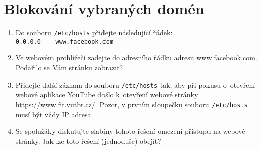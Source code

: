\section{Blokování vybraných domén}
\begin{enumerate}
	\item Do souboru \texttt{/etc/hosts} přidejte následující řádek:\\
    \verb|0.0.0.0    www.facebook.com|
    \item Ve webovém prohlížeči zadejte do adresního řádku adresu \url{www.facebook.com}. Podařilo se Vám stránku zobrazit?
    \item Přidejte další záznam do souboru \texttt{/etc/hosts} tak, aby při pokusu o~otevření webové aplikace YouTube došlo k~otevření webové stránky \url{https://www.fit.vutbr.cz/}. Pozor, v prvním sloupečku souboru \texttt{/etc/hosts} musí být vždy IP adresa.
    \item Se spolužáky diskutujte slabiny tohoto řešení omezení přístupu na webové stránky. Jak lze toto řešení (jednoduše) obejít?
\end{enumerate}

